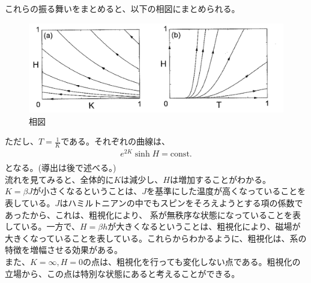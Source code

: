 \documentclass[a4paper,11pt]{jsarticle}
\numberwithin{equation}{section}
\begin{document}
これらの振る舞いをまとめると、以下の相図にまとめられる。
\begin{figure}[H]
    \begin{center}
    \includegraphics[width=120mm]{s.png}
    \end{center}
    \caption{相図}
    \label{fig:two}
\end{figure}
ただし、$T = \frac{1}{K}$である。それぞれの曲線は、
\begin{align}
    e^{2K}\sinh{H} = \text{const.} \label{eq:one}\\
\end{align}
となる。(導出は後で述べる。)\\
流れを見てみると、全体的に$K$は減少し、$H$は増加することがわかる。\\
$K = \beta J$が小さくなるということは、$J$を基準にした温度が高くなっていることを表している。$J$はハミルトニアンの中でもスピンをそろえようとする項の係数であったから、これは、粗視化により、
系が無秩序な状態になっていることを表している。一方で、$H = \beta h$が大きくなるということは、粗視化により、磁場が大きくなっていることを表している。これらからわかるように、粗視化は、系の特徴を増幅させる効果がある。\\
また、$K = \infty, H = 0$の点は、粗視化を行っても変化しない点である。粗視化の立場から、この点は特別な状態にあると考えることができる。\\
\end{document}
